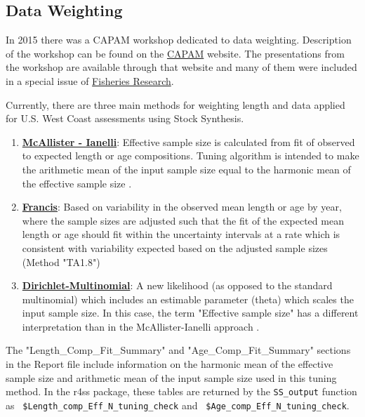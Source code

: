 \subsection{Data Weighting}
\label{sec:DataWeight}
\hypertarget{DataWeight}{}


In 2015 there was a CAPAM workshop dedicated to data weighting. Description of the workshop can be found on the \href{http://capamresearch.org/data-weighting/workshop}{CAPAM} website. The presentations from the workshop are available through that website and many of them were included in a special issue of \href{https://sciencedirect.com/journal/fisheries-research/vol/192}{Fisheries Research}.

Currently, there are three main methods for weighting length and data applied for U.S. West Coast assessments using Stock Synthesis.

\begin{enumerate}
	\item \hyperlink{MI}{\textbf{McAllister - Ianelli}}: Effective sample size is calculated from fit of observed to expected length or age compositions. Tuning algorithm is intended to make the arithmetic mean of the input sample size equal to the harmonic mean of the effective sample size \citep{mcallister-bayesian-1997}.
	
	\item \hyperlink{Francis}{\textbf{Francis}}: Based on variability in the observed mean length or age by year, where the sample sizes are adjusted such that the fit of the expected mean length or age should fit within the uncertainty intervals at a rate which is consistent with variability expected based on the adjusted sample sizes (Method "TA1.8") \citep{francis-data-2011}
	
	\item \hyperlink{DM}{\textbf{Dirichlet-Multinomial}}: A new likelihood (as opposed to the standard multinomial) which includes an estimable parameter (theta) which scales the input sample size. In this case, the term "Effective sample size" has a different interpretation than in the McAllister-Ianelli approach \citep{thorson-model-based-2017}.
\end{enumerate}


\hypertarget{MI}{}
The "Length\_Comp\_Fit\_Summary" and "Age\_Comp\_Fit\_Summary" sections in the Report file include information on the harmonic mean of the effective sample size and arithmetic mean of the input sample size used in this tuning method. In the r4ss package, these tables are returned by the \texttt{SS\_output} function as \texttt{ \$Length\_comp\_Eff\_N\_tuning\_check} and \texttt{ \$Age\_comp\_Eff\_N\_tuning\_check}.

